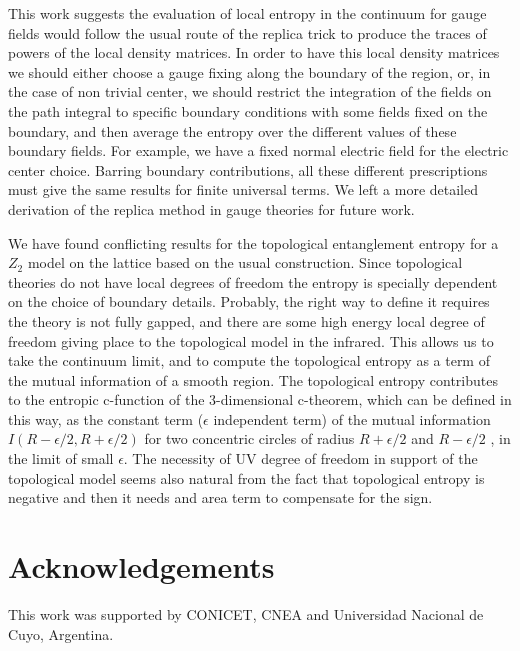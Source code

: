 \documentclass[12pt,a4paper]{article}
\begin{document}
This work suggests the evaluation of local entropy in the continuum for gauge fields would follow the 
usual route of the replica trick to produce the traces of powers of the local density matrices. In order to have this local
 density matrices we should either choose a gauge fixing along the boundary of the region, or, in the case of non trivial center, 
 we should restrict the integration of the fields on the path integral to specific boundary conditions with some fields fixed on the boundary, and then average the entropy over the different values of these boundary fields. For example, we have a fixed normal
  electric field for the electric center choice. Barring boundary contributions, all these different prescriptions must give the 
  same results for finite universal terms. We left a more detailed derivation of the replica method in gauge theories for future work.    

We have found conflicting results for the topological entanglement entropy for a $Z_2$ model on the lattice based on the usual construction. Since topological theories do not have local degrees of freedom the entropy is specially 
 dependent on the choice of boundary details.  
Probably, the right way to define it requires the theory is not fully gapped, and there are some high energy local degree 
of freedom giving place to the topological model in the infrared. This allows us to take the continuum limit, and to compute 
the topological entropy as a term of the mutual information of a smooth region. The topological entropy contributes to the entropic 
c-function of the 3-dimensional c-theorem, which can be defined in this way, as the constant term ($\epsilon$ independent term) of the mutual 
information $I(R-\epsilon/2,R+\epsilon/2)$ for two concentric circles of radius $R+\epsilon/2$ and $R-\epsilon/2$ \cite{mutualc}, in the limit of small $\epsilon$.  
The necessity of UV degree of freedom in support of the topological model seems also natural from the fact that topological 
entropy is negative and then it needs and area term to compensate for the sign. 

\section*{Acknowledgements}

This work was supported by CONICET, CNEA
and Universidad Nacional de Cuyo, Argentina.
\end{document}
